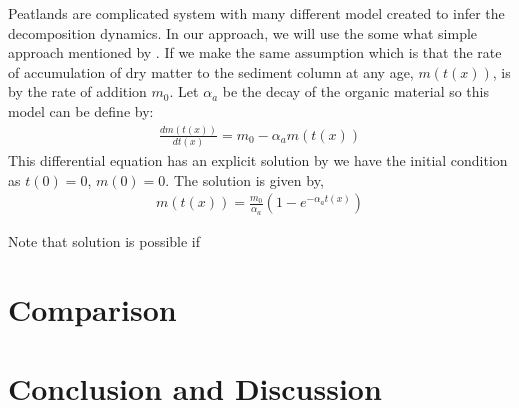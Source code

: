 \documentclass [10pt] {article}
\begin{document}
Peatlands are complicated system with many different model created to infer the decomposition dynamics. In our approach, we will use the some what simple approach mentioned by \citet{Clymo1984}. If we make the same assumption which is that the rate of accumulation of dry matter to the sediment column at any age, $m(t(x))$, is by the rate of addition $m_0$. Let $\alpha_a$ be the decay of the organic material so this model can be define by:
\begin{eqnarray}
	\frac{dm(t(x))}{dt(x)} = m_0 - \alpha_a m(t(x))
\end{eqnarray}
This differential equation has an explicit solution by we have the initial condition as $t(0)=0$, $m(0)=0$. The solution is given by,
\begin{eqnarray}
	m(t(x)) = \frac{m_0}{\alpha_a} \left( 1- e^{-\alpha_a t(x)}   \right)	
\end{eqnarray}

Note that solution is possible if 



\section{Comparison}







\section{Conclusion and Discussion}














\newpage
\end{document}
